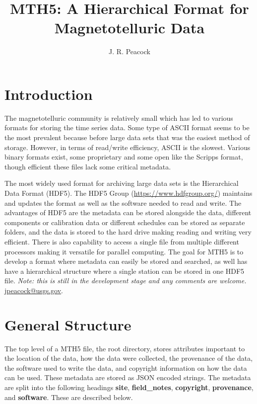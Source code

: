 \documentclass{article}
\title{\textbf{MTH5}: A Hierarchical Format for Magnetotelluric Data}
\author[1]{J. R. Peacock}
\affil[1]{U.S. Geological Survey}
\newcommand{\attr}[1]{\textbf{#1}}
\begin{document}
	
\maketitle
	
\newpage

\tableofcontents

\newpage

\section{Introduction}

The magnetotelluric community is relatively small which has led to various formats for storing the time series data.  Some type of ASCII format seems to be the most prevalent because before large data sets that was the easiest method of storage.  However, in terms of read/write efficiency, ASCII is the slowest.  Various binary formats exist, some proprietary and some open like the Scripps format, though efficient these files lack some critical metadata. 

The most widely used format for archiving large data sets is the Hierarchical Data Format (HDF5).  The HDF5 Group (\url{https://www.hdfgroup.org/}) maintains and updates the format as well as the software needed to read and write.  The advantages of HDF5 are the metadata can be stored alongside the data, different components or calibration data or different schedules can be stored as separate folders, and the data is stored to the hard drive making reading and writing very efficient.  There is also capability to access a single file from multiple different processors making it versatile for parallel computing.  The goal for MTH5 is to develop a format where metadata can easily be stored and searched, as well has have a hierarchical structure where a single station can be stored in one HDF5 file.  \textit{Note: this is still in the development stage and any comments are welcome.} \url{jpeacock@usgs.gov}.  

\section{General Structure}

The top level of a MTH5 file, the root directory, stores attributes important to the location of the data, how the data were collected, the provenance of the data, the software used to write the data, and copyright information on how the data can be used.  These metadata are stored as JSON encoded strings.  The metadata are split into the following headings \attr{site}, \attr{field\_notes}, \attr{copyright}, \attr{provenance}, and \attr{software}. These are described below. 
\end{document}
